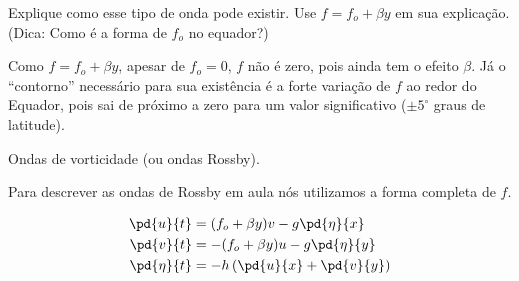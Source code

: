 \begin{parts}
  Explique como esse tipo de onda pode existir.  Use
  $f = f_o + \beta y$ em sua explicação.\\
  (Dica: Como é a forma de $f_o$ no equador?)

  \begin{solution}
   Como $f = f_o + \beta y$, apesar de $f_o = 0$, $f$ não é zero, pois ainda tem
   o efeito $\beta$.  Já o ``contorno'' necessário para sua existência é a forte
   variação de $f$ ao redor do Equador, pois sai de próximo a zero para um valor
   significativo ($\pm 5^{\circ}$ graus de latitude).
  \end{solution}

\end{parts}

\question
Ondas de vorticidade (ou ondas Rossby).

Para descrever as ondas de Rossby em aula nós utilizamos a forma completa de $f$.

\begin{align*}
  \pd{u}{t} &= (f_o + \beta y)v - g\pd{\eta}{x}\\
  \pd{v}{t} &= -(f_o + \beta y)u - g\pd{\eta}{y}\\
  \pd{\eta}{t} &= -h\left(\pd{u}{x} + \pd{v}{y}\right)
\end{align*}

